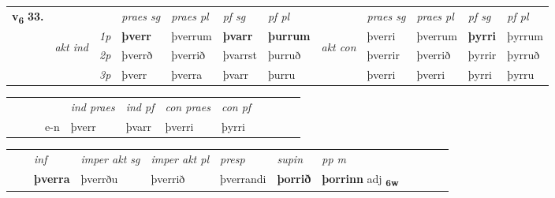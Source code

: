 \begin{tabular}{llllllllllll} \toprule
\multirow{4}{*}{{{\textbf{v{\textsubscript{6}}} \Large{\textbf{33.}}}}}  & &   &  \textit{praes sg}  & \textit{praes pl}  &\textit{ pf sg} & \textit{pf pl} &  &  \textit{praes sg}  & \textit{praes pl}  & \textit{pf sg} & \textit{pf pl } \\*
	\cmidrule{4-7} \cmidrule{9-12}
 & \multirow{3}{*}{\begin{turn}{90}\textit{akt ind}\end{turn}} & {\textit{1p}} & \textbf{þverr} & þverrum    & \textbf{þvarr} & \textbf{þurrum} & \multirow{3}{*}{\begin{turn}{90}\textit{akt con}\end{turn}} &þverri & þverrum & \textbf{þyrri} & þyrrum\\*
& &  {\textit{2p}} &  þverrð  & þverrið   & þvarrst & þurruð & & þverrir & þverrið & þyrrir & þyrruð \\*
& &  {\textit{3p}} & þverr & þverra   & þvarr & þurru & & þverri & þverri& þyrri & þyrru  \\*
\cmidrule{4-7} \cmidrule{9-12}
\end{tabular}


\begin{tabular}{llllllllllll}
 & &  & &  \textit{ind praes} & \textit{ind pf} & \textit{con praes} & \textit{con pf} \\*
&  & & e-n & þverr & þvarr & þverri & þyrri \\*
\cmidrule{5-9}
\end{tabular}


\begin{tabular}{llllllllllll}
 & & \textit{inf} & \textit{imper akt sg} & \textit{imper akt pl}   & \textit{presp} & \textit{supin}  & \textit{pp m}     \\*
  & & \textbf{þverra} & þverrðu  & þverrið   & þverrandi &  \textbf{þorrið}  & \textbf{þorrinn} adj \textbf{\textsubscript{6w}} \\*
\cmidrule{1-12}
\end{tabular}



